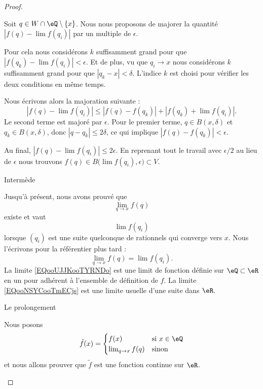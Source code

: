 \begin{proof}
\begin{subproof}
        Soit \( q\in W\cap\eQ\setminus\{ x \}\). Nous nous proposons de majorer la quantité $| f(q)-\lim f(q_i) |$ par un multiple de \( \epsilon\).

        Pour cela nous considérons \( k\) suffisamment grand pour que \( | f(q_k)-\lim f(q_i)  |<\epsilon\). Et de plus, vu que \( q_i\to x\) nous considérons \( k\) suffisamment grand pour que \( | q_k-x |<\delta\). L'indice \( k\) est choisi pour vérifier les deux conditions en même temps.

        Nous écrivons alors la majoration suivante :
        \begin{equation}
                | f(q)-\lim f(q_i) |\leq | f(q)-f(q_k) |+| f(q_k)+\lim f(q_i) |.
        \end{equation}
        Le second terme est majoré par \( \epsilon\). Pour le premier terme, \( q\in B(x,\delta)\) et \( q_k\in B(x,\delta)\), donc \( | q-q_k |\leq 2\delta\), ce qui implique \( | f(q)-f(q_k) |<\epsilon\).

        Au final, \( | f(q)-\lim f(q_i) |\leq 2\epsilon\). En reprenant tout le travail avec \( \epsilon/2\) au lieu de \( \epsilon\) nous trouvons \( f(q)\in B\big( \lim f(q_i),\epsilon \big)\subset V\).

    \item[Intermède]

        Jusqu'à présent, nous avons prouvé que
        \begin{equation}        \label{EQooUJJKooTYRNDo}
            \lim_{q\to x} f(q)
        \end{equation}
        existe et vaut
        \begin{equation}        \label{EQooNSYCooTmECjs}
            \lim f(q_i)
        \end{equation}
        lorsque \( (q_{i})\) est une suite quelconque de rationnels qui converge vers \( x\). Nous l'écrivons pour la référentier plus tard :
        \begin{equation}        \label{EQooSGCMooKtpVMy}
            \lim_{q\to x} f(q)=\lim f(q_i).
        \end{equation}
        La limite \eqref{EQooUJJKooTYRNDo} est une limit de fonction définie sur \( \eQ\subset \eR\) en un pour adhérent à l'ensemble de définition de \( f\). La limite \eqref{EQooNSYCooTmECjs} est une limite usuelle d'une suite dans \( \eR\).

    \item[Le prolongement]

        Nous posons
        \begin{equation}
            \tilde f(x)=\begin{cases}
                f(x)    &   \text{si } x\in \eQ\\
                \lim_{q\to x} f(q)    &    \text{sinon }
            \end{cases}
        \end{equation}
        et nous allons prouver que \( \tilde f\) est une fonction continue sur \( \eR\).


\end{subproof}
\end{proof}
